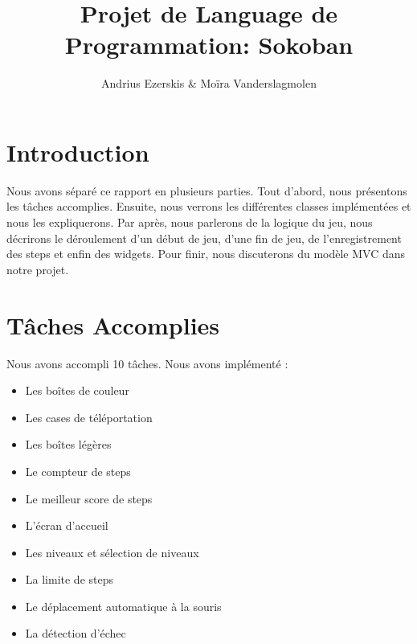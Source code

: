 \documentclass[utf8]{article}
\begin{document}
\begin{titlepage}


\author{Andrius Ezerskis \& Moïra Vanderslagmolen}
\title{Projet de Language de Programmation: Sokoban}

\maketitle
\end{titlepage}
\begin{large}

\section{Introduction}
\indent
\par
Nous avons séparé ce rapport en plusieurs parties. Tout d'abord, nous présentons
les tâches accomplies. Ensuite, nous verrons les différentes classes
implémentées et nous les expliquerons. Par après, nous parlerons de la logique
du jeu, nous décrirons le déroulement d'un début de jeu, d'une fin de jeu, de
l'enregistrement des steps et enfin des widgets. Pour finir, nous discuterons du
modèle MVC dans notre projet.

\par

\section{Tâches Accomplies}

\par
\indent

Nous avons accompli 10 tâches.
Nous avons implémenté :

\begin{itemize}
    \item Les boîtes de couleur
    \item Les cases de téléportation
    \item Les boîtes légères
    \item Le compteur de steps
    \item Le meilleur score de steps
    \item L'écran d'accueil
    \item Les niveaux et sélection de niveaux 
    \item La limite de steps
    \item Le déplacement automatique à la souris
    \item La détection d'échec
  \end{itemize}


\end{large}
\end{document}
